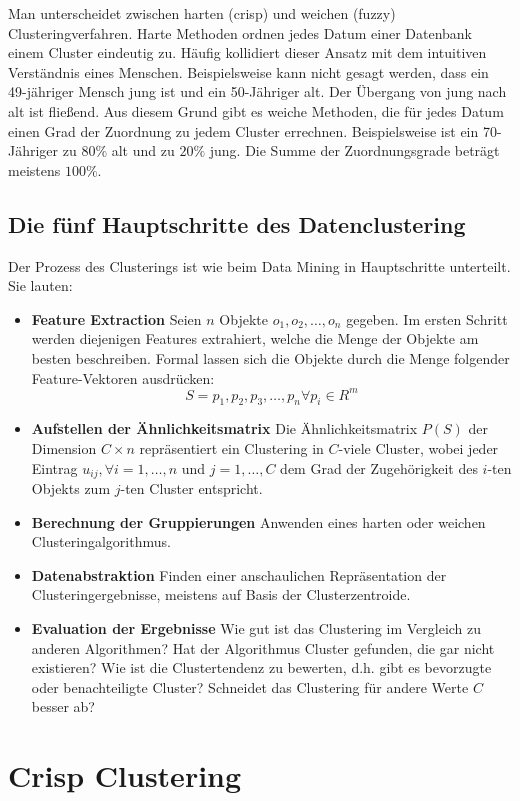 \documentclass[11pt,ceqn]{book}
\begin{document}
Man unterscheidet zwischen harten (crisp) und weichen (fuzzy) Clusteringverfahren. Harte Methoden ordnen jedes Datum einer Datenbank einem Cluster eindeutig zu. Häufig kollidiert dieser Ansatz mit dem intuitiven Verständnis eines Menschen. Beispielsweise kann nicht gesagt werden, dass ein 49-jähriger Mensch jung ist und ein 50-Jähriger alt. Der Übergang von jung nach alt ist fließend. Aus diesem Grund gibt es weiche Methoden, die für jedes Datum einen Grad der Zuordnung zu jedem Cluster errechnen. Beispielsweise ist ein 70-Jähriger zu $80\%$ alt und zu $20\%$ jung. Die Summe der Zuordnungsgrade beträgt meistens $100\%$.
\\
\subsection{Die fünf Hauptschritte des Datenclustering}
Der Prozess des Clusterings ist wie beim Data Mining in Hauptschritte unterteilt\cite{csteps}. Sie lauten:
\begin{itemize}
\item \textbf{Feature Extraction} Seien $n$ Objekte ${o_1, o_2, \dots, o_n}$ gegeben. Im ersten Schritt werden diejenigen Features extrahiert, welche die Menge der Objekte am besten beschreiben. Formal lassen sich die Objekte durch die Menge folgender Feature-Vektoren ausdrücken: $$S =  p_1, p_2, p_3, \dots, p_n  \forall p_i \in R^m$$
\item \textbf{Aufstellen der Ähnlichkeitsmatrix} Die Ähnlichkeitsmatrix $P(S)$ der Dimension $C \times n$ repräsentiert ein Clustering in $C$-viele Cluster, wobei jeder Eintrag $u_{ij}, \forall i=1, \dots, n$ und $j=1, \dots, C$ dem Grad der Zugehörigkeit des $i$-ten Objekts zum $j$-ten Cluster entspricht.
\item \textbf{Berechnung der Gruppierungen} Anwenden eines harten oder weichen Clusteringalgorithmus.
\item \textbf{Datenabstraktion} Finden einer anschaulichen Repräsentation der Clusteringergebnisse, meistens auf Basis der Clusterzentroide.
\item \textbf{Evaluation der Ergebnisse} Wie gut ist das Clustering im Vergleich zu anderen Algorithmen? Hat der Algorithmus Cluster gefunden, die gar nicht existieren? Wie ist die Clustertendenz zu bewerten, d.h. gibt es bevorzugte oder benachteiligte Cluster? Schneidet das Clustering für andere Werte $C$ besser ab?
\end{itemize}

\section{Crisp Clustering}
\end{document}
